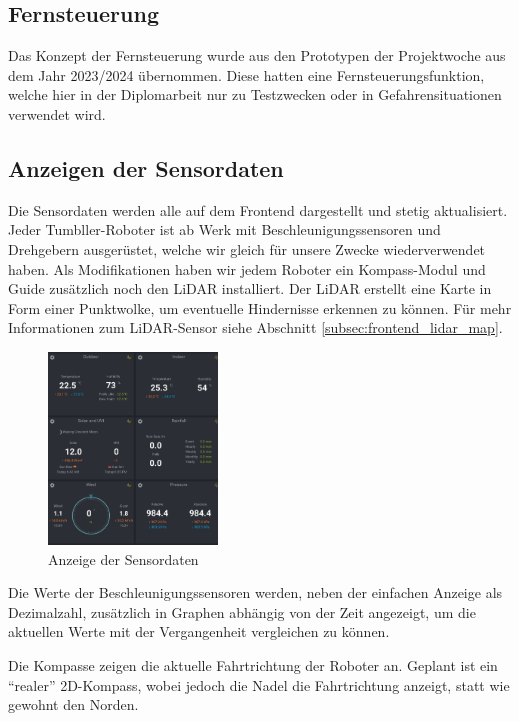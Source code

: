 \subsection{Fernsteuerung}
\label{subsec:frontend_control}
Das Konzept der Fernsteuerung wurde aus den Prototypen der Projektwoche aus dem Jahr 2023/2024 übernommen.
%
Diese hatten eine Fernsteuerungsfunktion,
welche hier in der Diplomarbeit nur zu Testzwecken oder in Gefahrensituationen verwendet wird.  

\subsection{Anzeigen der Sensordaten}
\label{subsec:frontend_sensors}
Die Sensordaten werden alle auf dem Frontend dargestellt und stetig aktualisiert.
%
Jeder Tumbller-Roboter ist ab Werk mit Beschleunigungssensoren und Drehgebern ausgerüstet,
welche wir gleich für unsere Zwecke wiederverwendet haben.
%
Als Modifikationen haben wir jedem Roboter ein Kompass-Modul
und Guide zusätzlich noch den LiDAR installiert.
%
Der LiDAR erstellt eine Karte in Form einer Punktwolke,
um eventuelle Hindernisse erkennen zu können.
%
Für mehr Informationen zum LiDAR-Sensor siehe Abschnitt \ref{subsec:frontend_lidar_map}.

\begin{figure}[H]
    \includegraphics[width=0.4\textwidth, center]{img/Sensor_Anzeige_LOESCHEN.png}
    \caption{Anzeige der Sensordaten}
    \label{fig:Sensordaten}
\end{figure}

Die Werte der Beschleunigungssensoren werden,
neben der einfachen Anzeige als Dezimalzahl,
zusätzlich in Graphen abhängig von der Zeit angezeigt,
um die aktuellen Werte mit der Vergangenheit vergleichen zu können.

Die Kompasse zeigen die aktuelle Fahrtrichtung der Roboter an.
Geplant ist ein ``realer'' 2D-Kompass,
wobei jedoch die Nadel die Fahrtrichtung anzeigt,
statt wie gewohnt den Norden.